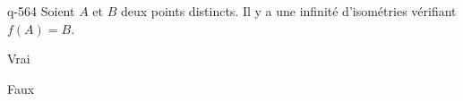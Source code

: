 \begin{truefalse}{q-564}
Soient $A$ et $B$ deux points distincts. Il y a une infinité d'isométries vérifiant $f(A)=B$.
\item* Vrai
\item Faux
\end{truefalse}


